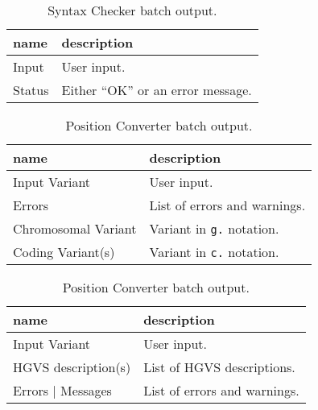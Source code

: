 \documentclass{article}
\begin{document}
\begin{table}[h]
  \caption{Syntax Checker batch output.}
  \label{tab:syntaxcheckbatch}
  \begin{center}
    \begin{tabular}{l|l}
      name   & description\\
      \hline
      Input  & User input.\\
      Status & Either ``OK'' or an error message.\\
    \end{tabular}
  \end{center}
\end{table}

\begin{table}[h]
  \caption{Position Converter batch output.}
  \label{tab:positionconvertbatch}
  \begin{center}
    \begin{tabular}{l|l}
      name                & description\\
      \hline
      Input Variant       & User input.\\
      Errors              & List of errors and warnings.\\
      Chromosomal Variant & Variant in \texttt{g.} notation.\\
      Coding Variant(s)   & Variant in \texttt{c.} notation.\\
    \end{tabular}
  \end{center}
\end{table}

\begin{table}[h]
  \caption{Position Converter batch output.}
  \label{tab:snpconvertbatch}
  \begin{center}
    \begin{tabular}{l|l}
      name                & description\\
      \hline
      Input Variant       & User input.\\
      HGVS description(s) & List of HGVS descriptions.\\
      Errors | Messages   & List of errors and warnings.\\
    \end{tabular}
  \end{center}
\end{table}
\end{document}
